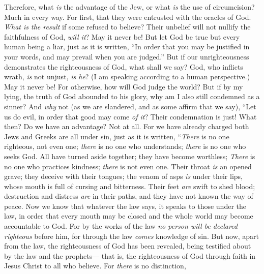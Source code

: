 \begin{biblechapter} %
 Therefore, what \textit{is} the advantage of the Jew, or what \textit{is} the use of circumcision?
\verse Much in every way. For first, that they were entrusted with the oracles of God.
\verse \textit{What is the result} if some refused to believe? Their unbelief will not nullify the faithfulness of God, \textit{will it}?
\verse May it never be! But let God be true but every human being a liar, just as it is written, “In order that you may be justified in your words, 
and may prevail when you are judged.”
\verse But if our unrighteousness demonstrates the righteousness of God, what shall we say? God, who inflicts wrath, \textit{is} not unjust, \textit{is he}? (I am speaking according to a human perspective.)
\verse May it never be! For otherwise, how will God judge the world?
\verse But if by my lying, the truth of God abounded to his glory, why am I also still condemned as a sinner?
\verse And \textit{why} not (as we are slandered, and as some affirm that we say), “Let us do evil, in order that good may come \textit{of it}? Their condemnation is just!
 What then? Do we have an advantage? Not at all. For we have already charged both Jews and Greeks are all under sin,
\verse just as it is written,
\verse “\textit{There} is no one righteous, not even one;
\verse \textit{there} is no one who understands; 
\textit{there} is no one who seeks God.
\verse All have turned aside together; they have become worthless; 
\textit{There} is no one who practices kindness; 
\textit{there} is not even one.
\verse Their throat \textit{is} an opened grave; 
they deceive with their tongues; 
the venom of asps \textit{is} under their lips,
\verse whose mouth is full of cursing and bitterness.
\verse Their feet \textit{are} swift to shed blood;
\verse destruction and distress \textit{are} in their paths,
\verse and they have not known the way of peace.
\verse Now we know that whatever the law says, it speaks to those under the law, in order that every mouth may be closed and the whole world may become accountable to God.
\verse For by the works of the law \textit{no person will be declared righteous} before him, for through the law \textit{comes} knowledge of sin.
 But now, apart from the law, the righteousness of God has been revealed, being testified about by the law and the prophets—
\verse that is, the righteousness of God through faith in Jesus Christ to all who believe. For \textit{there} is no distinction,

\end{biblechapter}
